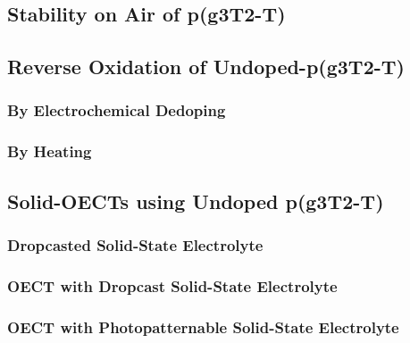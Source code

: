
\subsection{Stability on Air of p(g3T2-T)}

\subsection{Reverse Oxidation of Undoped-p(g3T2-T)}

\subsubsection{By Electrochemical Dedoping}

\subsubsection{By Heating}


\subsection{Solid-OECTs using Undoped p(g3T2-T)}




\subsubsection{Dropcasted Solid-State Electrolyte}

\subsubsection{OECT with Dropcast Solid-State Electrolyte}

\subsubsection{OECT with Photopatternable Solid-State Electrolyte}

